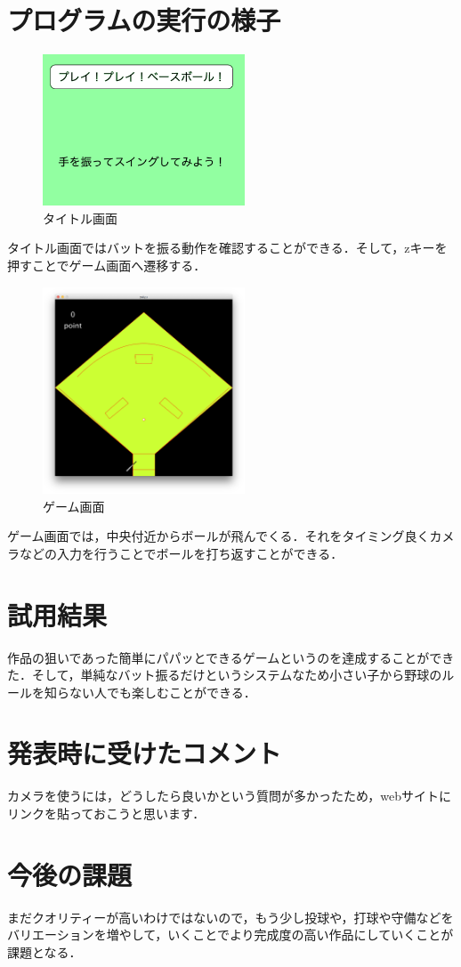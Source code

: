 \documentclass{jsarticle}
\begin{document}
\section{プログラムの実行の様子}
\begin{figure}[htbp]
\begin{minipage}{0.3\hsize}
\centering
\includegraphics[width=60mm]{title.png}
\caption{タイトル画面}
\label{fig:one}
\end{minipage}
\end{figure}
タイトル画面ではバットを振る動作を確認することができる．そして，zキーを押すことでゲーム画面へ遷移する．
\begin{figure}[htbp]
\begin{minipage}{0.3\hsize}
\centering
\includegraphics[width=60mm]{yakyu.png}
\caption{ゲーム画面}
\label{fig:two}
\end{minipage}
\end{figure}
ゲーム画面では，中央付近からボールが飛んでくる．それをタイミング良くカメラなどの入力を行うことでボールを打ち返すことができる．
\section{試用結果}
作品の狙いであった簡単にパパッとできるゲームというのを達成することができた．そして，単純なバット振るだけというシステムなため小さい子から野球のルールを知らない人でも楽しむことができる．
\section{発表時に受けたコメント}
カメラを使うには，どうしたら良いかという質問が多かったため，webサイトにリンクを貼っておこうと思います．
\section{今後の課題}
まだクオリティーが高いわけではないので，もう少し投球や，打球や守備などをバリエーションを増やして，いくことでより完成度の高い作品にしていくことが課題となる．
\end{document}
